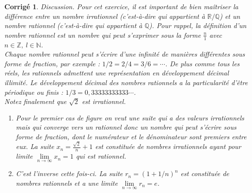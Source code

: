 \documentclass[11pt,french,table]{article}
\theoremstyle{exercice}
\theoremstyle{corrigé}
\newtheorem{corrigé}{Corrigé}
\begin{document}
\vspace{1em}
\begin{corrigé}
\textit{Discussion}. Pour cet exercice, il est important de bien maîtriser la différence entre un nombre irrationnel (c'est-à-dire  qui appartient à $\mathbb{R}/\mathbb{Q}$) et un nombre rationnel (c'est-à-dire qui appartient à $\mathbb{Q}$). Pour rappel, la définition d'un nombre rationnel est un nombre qui peut s'exprimer sous la forme $\frac{n}{1}$ avec $n\in \mathbb{Z}, \ l \in \mathbb{N}$. \\
Chaque nombre rationnel peut s'écrire d'une infinité de manières différentes sous forme de fraction, par exemple : $1/2=2/4=3/6=\cdots$. De plus comme tous les réels, les rationnels admettent une représentation en développement décimal illimité. Le développement décimal des nombres rationnels a la particularité d'être périodique ou finis : $1/3=0,33333333333\cdots$.\\ Notez finalement que $\sqrt{2}$ est irrationnel.\\
\begin{enumerate}
    \item[(a)] Pour le premier cas de figure on veut une suite qui a des valeurs irrationnels mais qui converge vers un rationnel donc un nombre qui peut s'écrire sous forme de fraction, dont le numérateur et le dénominateur sont premiers entre eux. La suite $x_n=\frac{\sqrt{2}}{n}+1$ est constituée de nombres irrationnels ayant pour limite $\lim\limits_{n\to \infty}{x_n}=1$ qui est rationnel.
    \item[(b)] C'est l'inverse cette fois-ci. La suite $r_n=(1+ 1/n)^n$ est constituée de nombres rationnels et a une limite $\lim\limits_{n\to \infty}{r_n}=e$. 
\end{enumerate}
\end{corrigé}
\vspace{1em}
\end{document}
